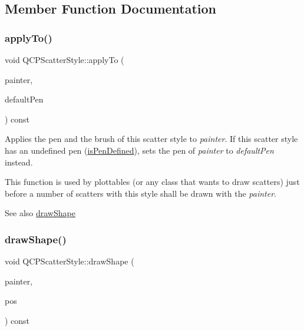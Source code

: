 \subsection{Member Function Documentation}
\mbox{\label{classQCPScatterStyle_afd8044ece445300499ca0dc164821e0f}} 
\subsubsection{\texorpdfstring{apply\+To()}{applyTo()}}
{\footnotesize\ttfamily void Q\+C\+P\+Scatter\+Style\+::apply\+To (\begin{DoxyParamCaption}\item[{\hyperlink{classQCPPainter}{Q\+C\+P\+Painter} $\ast$}]{painter,  }\item[{const Q\+Pen \&}]{default\+Pen }\end{DoxyParamCaption}) const}

Applies the pen and the brush of this scatter style to {\itshape painter}. If this scatter style has an undefined pen (\hyperlink{classQCPScatterStyle_a47077eb6450fe9a788f833e4ec1b1d5a}{is\+Pen\+Defined}), sets the pen of {\itshape painter} to {\itshape default\+Pen} instead.

This function is used by plottables (or any class that wants to draw scatters) just before a number of scatters with this style shall be drawn with the {\itshape painter}.

\begin{DoxySeeAlso}{See also}
\hyperlink{classQCPScatterStyle_a89b5105e6027bfcbfeefed9d201b607c}{draw\+Shape} 
\end{DoxySeeAlso}
\mbox{\label{classQCPScatterStyle_a89b5105e6027bfcbfeefed9d201b607c}} 
\subsubsection{\texorpdfstring{draw\+Shape()}{drawShape()}\hspace{0.1cm}{\footnotesize\ttfamily [1/2]}}
{\footnotesize\ttfamily void Q\+C\+P\+Scatter\+Style\+::draw\+Shape (\begin{DoxyParamCaption}\item[{\hyperlink{classQCPPainter}{Q\+C\+P\+Painter} $\ast$}]{painter,  }\item[{const Q\+PointF \&}]{pos }\end{DoxyParamCaption}) const}


